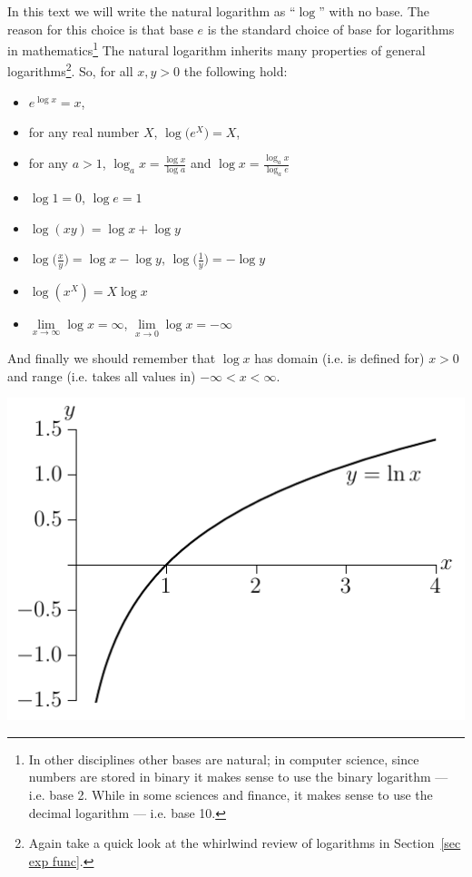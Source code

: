In this text we will write the natural logarithm as ``$\log$'' with no base.
The reason for this choice is that base $e$ is the standard choice of base for
logarithms in mathematics\footnote{In other disciplines other bases are
natural; in computer science, since numbers are stored in binary it makes sense
to use the binary logarithm --- i.e. base 2. While in some sciences and finance, it makes
sense to use the decimal logarithm --- i.e. base 10.}
The natural logarithm inherits many properties of general
logarithms\footnote{Again take a quick look at the whirlwind review of
logarithms in Section~\ref{sec exp func}.}. So, for all $x,y>0$ the following
hold:
\begin{itemize}
\item $e^{\log x}=x$,
\item for any real number $X$, $\log \big(e^X\big)=X$,
\item for any $a>1$, $\log_a x=\tfrac{\log x}{\log a}$ and $\log
x=\tfrac{\log_a x}{\log_a e}$
\item $\log 1=0$, $\log e=1$
\item $\log(xy)=\log x+\log y$
\item $\log\big(\tfrac{x}{y}\big)=\log x-\log y$,
      $\log\big(\tfrac{1}{y}\big)=-\log y$
\item $\log(x^X)=X\log x$
\item $\lim\limits_{x\rightarrow\infty}\log x=\infty$,
           $\lim\limits_{x\rightarrow0}\log x=-\infty$
\end{itemize}
And finally we should remember that $\log x$ has domain (i.e. is defined for) $x > 0$ and
range (i.e. takes all values in) $-\infty <x <\infty$.
\begin{fig}
\begin{center}
   \includegraphics{logGraph}
\end{center}
\end{fig}


